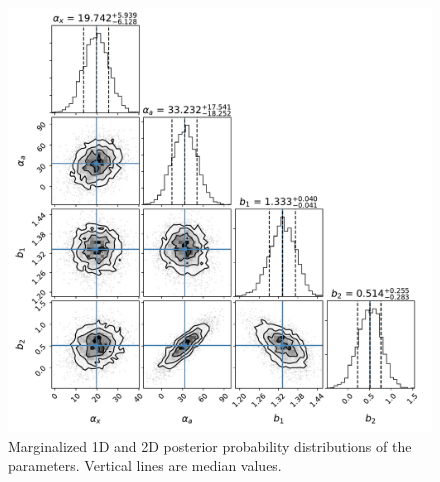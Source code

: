 \documentclass[a4paper,usenatbib]{mnras}
\begin{document}
\begin{figure}
\includegraphics[width=\linewidth,trim={0.4cm 0.2cm 0.2cm 0.2cm},clip]{figures/corner_plot.pdf}
\caption{Marginalized 1D and 2D posterior probability distributions of the parameters. Vertical lines are median values.}
\label{fig:lptmcmc}
\end{figure}
\end{document}
